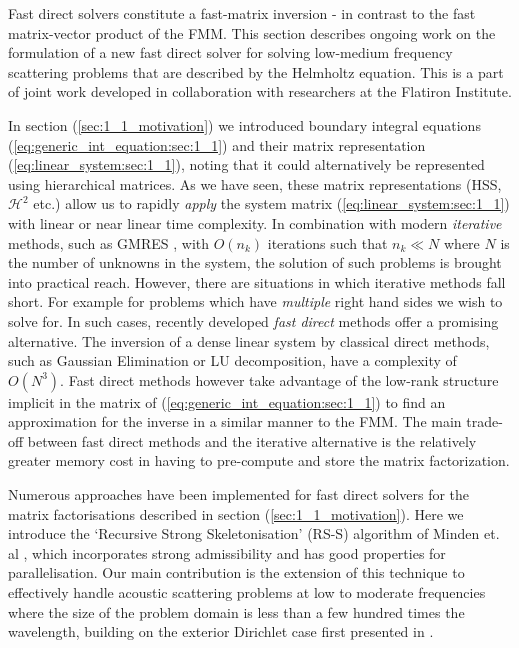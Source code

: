Fast direct solvers constitute a fast-matrix inversion - in contrast to the fast matrix-vector product of the FMM. This section describes ongoing work on the formulation of a new fast direct solver for solving low-medium frequency scattering problems that are described by the Helmholtz equation. This is a part of joint work developed in collaboration with researchers at the Flatiron Institute. 

In section (\ref{sec:1_1_motivation}) we introduced boundary integral equations (\ref{eq:generic_int_equation:sec:1_1}) and their matrix representation (\ref{eq:linear_system:sec:1_1}), noting that it could alternatively be represented using hierarchical matrices. As we have seen, these matrix representations (HSS, $\mathcal{H}^2$ etc.) allow us to rapidly \textit{apply} the system matrix (\ref{eq:linear_system:sec:1_1}) with linear or near linear time complexity. In combination with modern \textit{iterative} methods, such as GMRES \cite{saad1986gmres}, with $O(n_k)$ iterations such that $n_k \ll N$ where $N$ is the number of unknowns in the system, the solution of such problems is brought into practical reach. However, there are situations in which iterative methods fall short. For example for problems which have \textit{multiple} right hand sides we wish to solve for. In such cases, recently developed \textit{fast direct} methods offer a promising alternative. The inversion of a dense linear system by classical direct methods, such as Gaussian Elimination or LU decomposition, have a complexity of $O(N^3)$. Fast direct methods however take advantage of the low-rank structure implicit in the matrix of (\ref{eq:generic_int_equation:sec:1_1}) to find an approximation for the inverse in a similar manner to the FMM. The main trade-off between fast direct methods and the iterative alternative is the relatively greater memory cost in having to pre-compute and store the matrix factorization.

Numerous approaches have been implemented for fast direct solvers for the matrix factorisations described in section (\ref{sec:1_1_motivation}). Here we introduce the `Recursive Strong Skeletonisation' (RS-S) algorithm of Minden et. al \cite{minden2017recursive}, which incorporates strong admissibility and has good properties for parallelisation. Our main contribution is the extension of this technique to effectively handle acoustic scattering problems at low to moderate frequencies where the size of the problem domain is less than a few hundred times the wavelength, building on the exterior Dirichlet case first presented in \cite{sushnikova2022fmm}. 

